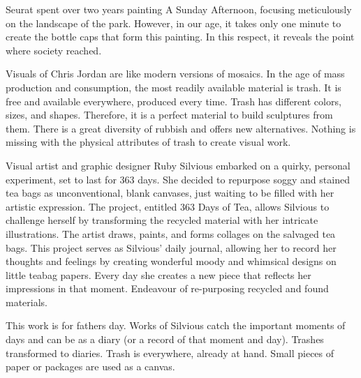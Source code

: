 Seurat spent over two years painting A Sunday Afternoon, focusing meticulously on the landscape of the park. However, in our age, it takes only one minute to create the bottle caps that form this painting. In this respect, it reveals the point where society reached.

Visuals of Chris Jordan are like modern versions of mosaics. In the age of mass production and consumption, the most readily available material is trash. It is free and available everywhere, produced every time. Trash has different colors, sizes, and shapes. Therefore, it is a perfect material to build sculptures from them. There is a great diversity of rubbish and offers new alternatives. Nothing is missing with the physical attributes of trash to create visual work.



  
Visual artist and graphic designer Ruby Silvious embarked on a quirky, personal experiment, set to last for 363 days. She decided to repurpose soggy and stained tea bags as unconventional, blank canvases, just waiting to be filled with her artistic expression. The project, entitled 363 Days of Tea, allows Silvious to challenge herself by transforming the recycled material with her intricate illustrations. The artist draws, paints, and forms collages on the salvaged tea bags. This project serves as Silvious’ daily journal, allowing her to record her thoughts and feelings by creating wonderful moody and whimsical designs on little teabag papers. Every day she creates a new piece that reflects her impressions in that moment. Endeavour of re-purposing recycled and found materials. 

This work is for fathers day. Works of Silvious catch the important moments of days and can be as a diary (or a record of that moment and day). Trashes transformed to diaries. Trash is everywhere, already at hand. Small pieces of paper or packages are used as a canvas. 

